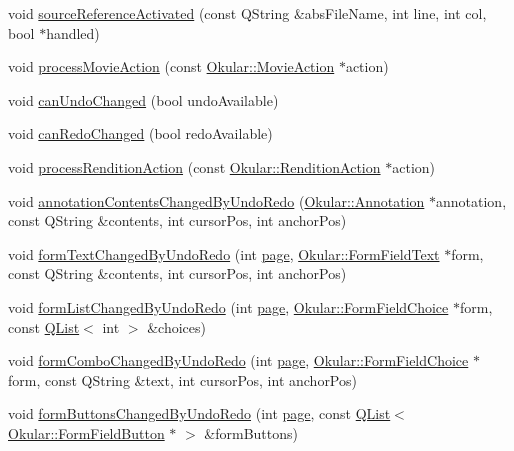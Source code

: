 \begin{DoxyCompactItemize}
\item 
void \hyperlink{classOkular_1_1Document_a7a445d187c36e3c37b282dabbcafe8a0}{source\+Reference\+Activated} (const Q\+String \&abs\+File\+Name, int line, int col, bool $\ast$handled)
\item 
void \hyperlink{classOkular_1_1Document_ad89902f864830b39f5a7a5c2ebaffb65}{process\+Movie\+Action} (const \hyperlink{classOkular_1_1MovieAction}{Okular\+::\+Movie\+Action} $\ast$action)
\item 
void \hyperlink{classOkular_1_1Document_a26f1d9eebc095fc150af881b62b2238b}{can\+Undo\+Changed} (bool undo\+Available)
\item 
void \hyperlink{classOkular_1_1Document_a503f3e63322d9df95df8b07919edce7a}{can\+Redo\+Changed} (bool redo\+Available)
\item 
void \hyperlink{classOkular_1_1Document_ade897d8484f476a2224eac652d9ece77}{process\+Rendition\+Action} (const \hyperlink{classOkular_1_1RenditionAction}{Okular\+::\+Rendition\+Action} $\ast$action)
\item 
void \hyperlink{classOkular_1_1Document_a755d2a16ad3ed30996c93924f7232e36}{annotation\+Contents\+Changed\+By\+Undo\+Redo} (\hyperlink{classOkular_1_1Annotation}{Okular\+::\+Annotation} $\ast$annotation, const Q\+String \&contents, int cursor\+Pos, int anchor\+Pos)
\item 
void \hyperlink{classOkular_1_1Document_af534e0e010225b2a57319845442888bb}{form\+Text\+Changed\+By\+Undo\+Redo} (int \hyperlink{classOkular_1_1Document_a1c95c2f192d739c217d00971da48f69d}{page}, \hyperlink{classOkular_1_1FormFieldText}{Okular\+::\+Form\+Field\+Text} $\ast$form, const Q\+String \&contents, int cursor\+Pos, int anchor\+Pos)
\item 
void \hyperlink{classOkular_1_1Document_aff101795b7dee001d4e8677ded3236be}{form\+List\+Changed\+By\+Undo\+Redo} (int \hyperlink{classOkular_1_1Document_a1c95c2f192d739c217d00971da48f69d}{page}, \hyperlink{classOkular_1_1FormFieldChoice}{Okular\+::\+Form\+Field\+Choice} $\ast$form, const \hyperlink{classQList}{Q\+List}$<$ int $>$ \&choices)
\item 
void \hyperlink{classOkular_1_1Document_ada246b3ac5212e3911dc339b75da13da}{form\+Combo\+Changed\+By\+Undo\+Redo} (int \hyperlink{classOkular_1_1Document_a1c95c2f192d739c217d00971da48f69d}{page}, \hyperlink{classOkular_1_1FormFieldChoice}{Okular\+::\+Form\+Field\+Choice} $\ast$form, const Q\+String \&text, int cursor\+Pos, int anchor\+Pos)
\item 
void \hyperlink{classOkular_1_1Document_adbfa4da2eb8267d4bde6a9c6784e033b}{form\+Buttons\+Changed\+By\+Undo\+Redo} (int \hyperlink{classOkular_1_1Document_a1c95c2f192d739c217d00971da48f69d}{page}, const \hyperlink{classQList}{Q\+List}$<$ \hyperlink{classOkular_1_1FormFieldButton}{Okular\+::\+Form\+Field\+Button} $\ast$ $>$ \&form\+Buttons)
\end{DoxyCompactItemize}
